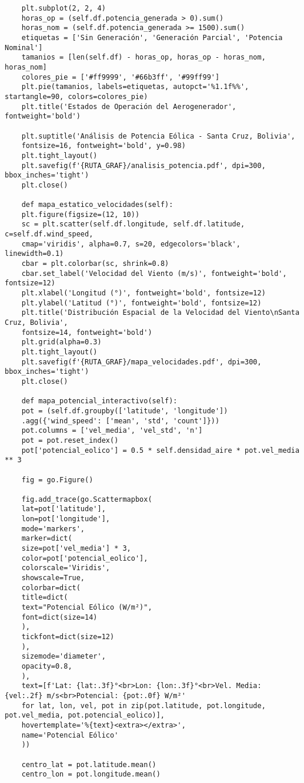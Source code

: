\begin{lstlisting}
	plt.subplot(2, 2, 4)
	horas_op = (self.df.potencia_generada > 0).sum()
	horas_nom = (self.df.potencia_generada >= 1500).sum()
	etiquetas = ['Sin Generación', 'Generación Parcial', 'Potencia Nominal']
	tamanios = [len(self.df) - horas_op, horas_op - horas_nom, horas_nom]
	colores_pie = ['#ff9999', '#66b3ff', '#99ff99']
	plt.pie(tamanios, labels=etiquetas, autopct='%1.1f%%', startangle=90, colors=colores_pie)
	plt.title('Estados de Operación del Aerogenerador', fontweight='bold')
	
	plt.suptitle('Análisis de Potencia Eólica - Santa Cruz, Bolivia', 
	fontsize=16, fontweight='bold', y=0.98)
	plt.tight_layout()
	plt.savefig(f'{RUTA_GRAF}/analisis_potencia.pdf', dpi=300, bbox_inches='tight')
	plt.close()
	
	def mapa_estatico_velocidades(self):
	plt.figure(figsize=(12, 10))
	sc = plt.scatter(self.df.longitude, self.df.latitude, c=self.df.wind_speed, 
	cmap='viridis', alpha=0.7, s=20, edgecolors='black', linewidth=0.1)
	cbar = plt.colorbar(sc, shrink=0.8)
	cbar.set_label('Velocidad del Viento (m/s)', fontweight='bold', fontsize=12)
	plt.xlabel('Longitud (°)', fontweight='bold', fontsize=12)
	plt.ylabel('Latitud (°)', fontweight='bold', fontsize=12)
	plt.title('Distribución Espacial de la Velocidad del Viento\nSanta Cruz, Bolivia', 
	fontsize=14, fontweight='bold')
	plt.grid(alpha=0.3)
	plt.tight_layout()
	plt.savefig(f'{RUTA_GRAF}/mapa_velocidades.pdf', dpi=300, bbox_inches='tight')
	plt.close()
	
	def mapa_potencial_interactivo(self):
	pot = (self.df.groupby(['latitude', 'longitude'])
	.agg({'wind_speed': ['mean', 'std', 'count']}))
	pot.columns = ['vel_media', 'vel_std', 'n']
	pot = pot.reset_index()
	pot['potencial_eolico'] = 0.5 * self.densidad_aire * pot.vel_media ** 3
	
	fig = go.Figure()
	
	fig.add_trace(go.Scattermapbox(
	lat=pot['latitude'],
	lon=pot['longitude'],
	mode='markers',
	marker=dict(
	size=pot['vel_media'] * 3,
	color=pot['potencial_eolico'],
	colorscale='Viridis',
	showscale=True,
	colorbar=dict(
	title=dict(
	text="Potencial Eólico (W/m²)",
	font=dict(size=14)
	),
	tickfont=dict(size=12)  
	),
	sizemode='diameter',
	opacity=0.8,
	),
	text=[f'Lat: {lat:.3f}°<br>Lon: {lon:.3f}°<br>Vel. Media: {vel:.2f} m/s<br>Potencial: {pot:.0f} W/m²'
	for lat, lon, vel, pot in zip(pot.latitude, pot.longitude, pot.vel_media, pot.potencial_eolico)],
	hovertemplate='%{text}<extra></extra>',
	name='Potencial Eólico'
	))
	
	centro_lat = pot.latitude.mean()
	centro_lon = pot.longitude.mean()
	

\end{lstlisting}
